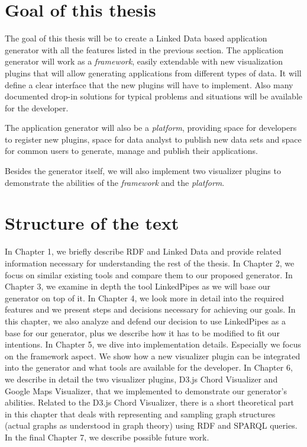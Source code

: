 \section*{Goal of this thesis}

The goal of this thesis will be to create a Linked Data based application generator with all the features listed in the previous section. The application generator will work as a \textit{framework}, easily extendable with new visualization plugins that will allow generating applications from different types of data. It will define a clear interface that the new plugins will have to implement. Also many documented drop-in solutions for typical problems and situations will be available for the developer.

The application generator will also be a \textit{platform}, providing space for developers to register new plugins, space for data analyst to publish new data sets and space for common users to generate, manage and publish their applications.

Besides the generator itself, we will also implement two visualizer plugins to demonstrate the abilities of the \textit{framework} and the \textit{platform}.

\section*{Structure of the text}

In Chapter 1, we briefly describe RDF and Linked Data and provide related information necessary for understanding the rest of the thesis. In Chapter 2, we focus on similar existing tools and compare them to our proposed generator. In Chapter 3, we examine in depth the tool LinkedPipes as we will base our generator on top of it.  In Chapter 4, we look more in detail into the required features and we present steps and decisions necessary for achieving our goals. In this chapter, we also analyze and defend our decision to use LinkedPipes as a base for our generator, plus we describe how it has to be modified to fit our intentions. In Chapter 5, we dive into implementation details. Especially we focus on the framework aspect. We show how a new visualizer plugin can be integrated into the generator and what tools are available for the developer. In Chapter 6, we describe in detail the two visualizer plugins, D3.js Chord Visualizer and Google Maps Visualizer, that we implemented to demonstrate our generator's abilities. Related to the D3.js Chord Visualizer, there is a short theoretical part in this chapter that deals with representing and sampling graph structures (actual graphs as understood in graph theory) using RDF and SPARQL queries. In the final Chapter 7, we describe possible future work.